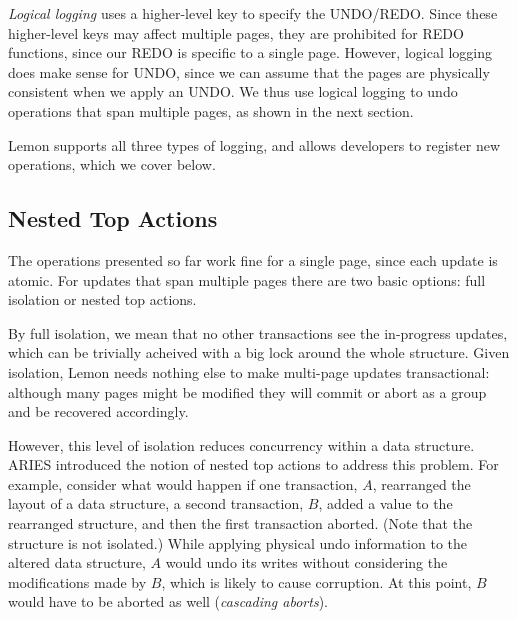 \documentclass[letterpaper,twocolumn,english]{article}
\newcommand{\yad}{Lemon\xspace}
\begin{document}
{\em Logical logging} uses a higher-level key to specify the
UNDO/REDO.  Since these higher-level keys may affect multiple pages,
they are prohibited for REDO functions, since our REDO is specific to
a single page.  However, logical logging does make sense for UNDO,
since we can assume that the pages are physically consistent when we
apply an UNDO.  We thus use logical logging to undo operations that
span multiple pages, as shown in the next section.


\yad supports all three types of logging, and allows developers to
register new operations, which we cover below.


\subsection{Nested Top Actions}
\label{nested-top-actions}

The operations presented so far work fine for a single page, since
each update is atomic.  For updates that span multiple pages there are two basic options: full isolation or nested top actions.

By full isolation, we mean that no other transactions see the
in-progress updates, which can be trivially acheived with a big lock
around the whole structure.  Given isolation, \yad needs nothing else to
make multi-page updates transactional: although many pages might be
modified they will commit or abort as a group and be recovered
accordingly.

However, this level of isolation reduces concurrency within a data
structure.  ARIES introduced the notion of nested top actions to
address this problem.  For example, consider what would happen if one
transaction, $A$, rearranged the layout of a data structure, a second
transaction, $B$, added a value to the rearranged structure, and then
the first transaction aborted.  (Note that the structure is not
isolated.)  While applying physical undo information to the altered
data structure,  $A$ would undo its writes
without considering the modifications made by
$B$, which is likely to cause corruption.  At this point, $B$ would
have to be aborted as well ({\em cascading aborts}).
\end{document}
